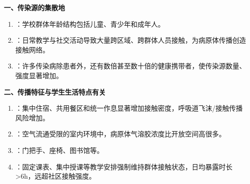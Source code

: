 \begin{keybox}
\textbf{一、传染源的集散地}
\begin{enumerate}[leftmargin=*]
    \item {}：学校群体年龄结构包括儿童、青少年和成年人。
    \item {}：日常教学与社交活动导致大量跨区域、跨群体人员接触，为病原体传播创造接触网络。
    \item {}：许多传染病除患者外，还有数倍甚至数十倍的健康携带者，使传染源数量、强度显著增加。
\end{enumerate}

\textbf{二、传播特征与学生生活特点有关}
\begin{enumerate}[leftmargin=*]
    \item {}：集中住宿、共用餐区和统一作息显著增加接触密度，呼吸道飞沫/接触传播风险增加。
    \item {}：空气流通受限的室内环境中，病原体气溶胶浓度比开放空间高很多。
    \item {}：门把手、座椅、图书馆等。
    \item {}：固定课表、集中授课等教学安排强制维持群体接触状态，日均暴露时长>6h，远超社区接触强度。
\end{enumerate}


\end{keybox}
